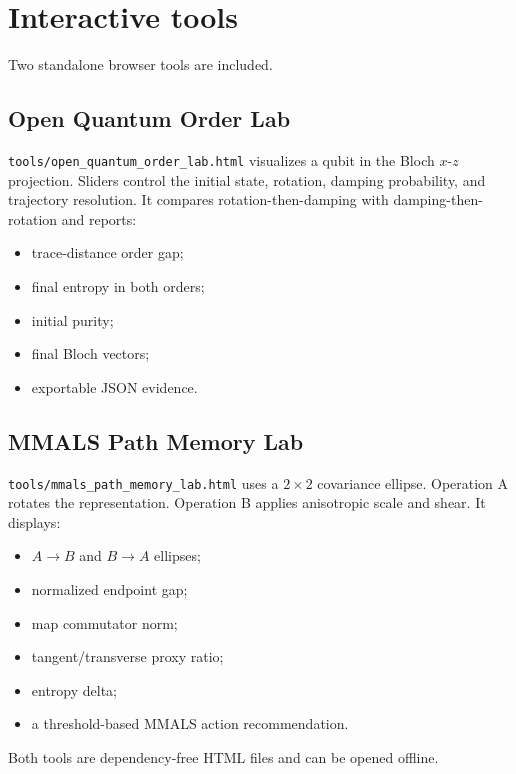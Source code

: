 \section{Interactive tools}

Two standalone browser tools are included.

\subsection{Open Quantum Order Lab}

\texttt{tools/open\_quantum\_order\_lab.html} visualizes a qubit in the Bloch $x$-$z$ projection. Sliders control the initial state, rotation, damping probability, and trajectory resolution. It compares rotation-then-damping with damping-then-rotation and reports:

\begin{itemize}
  \item trace-distance order gap;
  \item final entropy in both orders;
  \item initial purity;
  \item final Bloch vectors;
  \item exportable JSON evidence.
\end{itemize}

\subsection{MMALS Path Memory Lab}

\texttt{tools/mmals\_path\_memory\_lab.html} uses a $2\times2$ covariance ellipse. Operation A rotates the representation. Operation B applies anisotropic scale and shear. It displays:

\begin{itemize}
  \item $A\rightarrow B$ and $B\rightarrow A$ ellipses;
  \item normalized endpoint gap;
  \item map commutator norm;
  \item tangent/transverse proxy ratio;
  \item entropy delta;
  \item a threshold-based MMALS action recommendation.
\end{itemize}

Both tools are dependency-free HTML files and can be opened offline.

